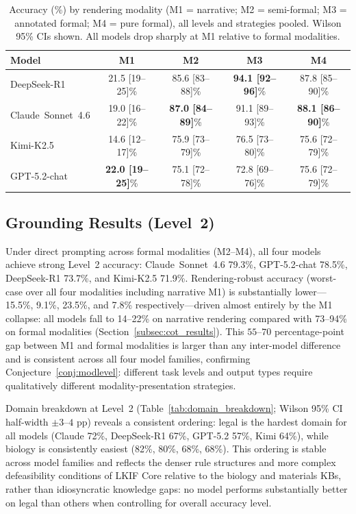\documentclass{article}
\theoremstyle{definition}
\begin{document}
\begin{table}[h]
\centering
\caption{Accuracy (\%) by rendering modality (M1 = narrative; M2 = semi-formal; M3 = annotated formal; M4 = pure formal), all levels and strategies pooled. Wilson 95\% CIs shown. All models drop sharply at M1 relative to formal modalities.}
\label{tab:modality}
\begin{tabular}{lcccc}
\toprule
Model & M1 & M2 & M3 & M4 \\
\midrule
DeepSeek-R1         & 21.5 [19--25]\% & 85.6 [83--88]\% & \textbf{94.1 [92--96]}\% & 87.8 [85--90]\% \\
Claude~Sonnet~4.6   & 19.0 [16--22]\% & \textbf{87.0 [84--89]}\% & 91.1 [89--93]\% & \textbf{88.1 [86--90]}\% \\
Kimi-K2.5           & 14.6 [12--17]\% & 75.9 [73--79]\% & 76.5 [73--80]\% & 75.6 [72--79]\% \\
GPT-5.2-chat        & \textbf{22.0 [19--25]}\% & 75.1 [72--78]\% & 72.8 [69--76]\% & 75.6 [72--79]\% \\
\bottomrule
\end{tabular}
\end{table}

\subsection{Grounding Results (Level~2)}\label{subsec:grounding_results}

Under direct prompting across formal modalities (M2--M4), all four models achieve strong Level~2 accuracy: Claude~Sonnet~4.6 79.3\%, GPT-5.2-chat 78.5\%, DeepSeek-R1 73.7\%, and Kimi-K2.5 71.9\%. Rendering-robust accuracy (worst-case over all four modalities including narrative M1) is substantially lower---15.5\%, 9.1\%, 23.5\%, and 7.8\% respectively---driven almost entirely by the M1 collapse: all models fall to 14--22\% on narrative rendering compared with 73--94\% on formal modalities (Section~\ref{subsec:cot_results}). This $55$--$70$ percentage-point gap between M1 and formal modalities is larger than any inter-model difference and is consistent across all four model families, confirming Conjecture~\ref{conj:modlevel}: different task levels and output types require qualitatively different modality-presentation strategies.

Domain breakdown at Level~2 (Table~\ref{tab:domain_breakdown}; Wilson 95\% CI half-width $\pm 3$--$4$ pp) reveals a consistent ordering: legal is the hardest domain for all models (Claude 72\%, DeepSeek-R1 67\%, GPT-5.2 57\%, Kimi 64\%), while biology is consistently easiest (82\%, 80\%, 68\%, 68\%). This ordering is stable across model families and reflects the denser rule structures and more complex defeasibility conditions of LKIF Core relative to the biology and materials KBs, rather than idiosyncratic knowledge gaps: no model performs substantially better on legal than others when controlling for overall accuracy level.
\end{document}
